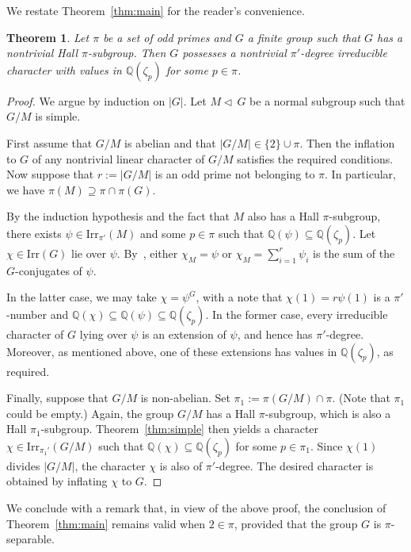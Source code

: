 \documentclass[12pt]{amsart}
\newtheorem{theorem}{Theorem}[section]
\theoremstyle{definition}
\numberwithin{equation}{section}
\newcommand{\Irr}{{\mathrm {Irr}}}
\newcommand{\QQ}{{\mathbb Q}}
\begin{document}
We restate Theorem~\ref{thm:main} for the reader's convenience.

\begin{theorem}
Let $\pi$ be a set of odd primes and $G$ a finite group such that
$G$ has a nontrivial Hall $\pi$-subgroup. Then $G$ possesses a
nontrivial $\pi'$-degree irreducible character with values in
$\QQ(\zeta_p)$ for some $p\in\pi$.
\end{theorem}

\begin{proof}
We argue by induction on $|G|$. Let $M \triangleleft\, G$ be a
normal subgroup such that $G/M$ is simple.

First assume that $G/M$ is abelian and that $|G/M| \in \{2\} \cup
\pi$. Then the inflation to $G$ of any nontrivial linear character
of $G/M$ satisfies the required conditions. Now suppose that $r :=
|G/M|$ is an odd prime not belonging to $\pi$. In particular, we
have $\pi(M) \supseteq \pi\cap\pi(G)$.

By the induction hypothesis and the fact that $M$ also has a Hall
$\pi$-subgroup, there exists $\psi \in \Irr_{\pi'}(M)$ and some $p
\in \pi$ such that $\QQ(\psi) \subseteq \QQ(\zeta_p)$. Let $\chi \in
\Irr(G)$ lie over $\psi$. By~\cite[Corollary~6.19]{Isaacs1}, either
$\chi_M = \psi$ or $\chi_M = \sum_{i=1}^r \psi_i$ is the sum of the
$G$-conjugates of $\psi$.

In the latter case, we may take $\chi = \psi^G$, with a note that
$\chi(1) = r \psi(1)$ is a $\pi'$-number and $\QQ(\chi) \subseteq
\QQ(\psi)\subseteq \QQ(\zeta_p)$. In the former case, every
irreducible character of $G$ lying over $\psi$ is an extension of
$\psi$, and hence has $\pi'$-degree. Moreover, as mentioned above,
one of these extensions has values in $\QQ(\zeta_p)$, as required.

Finally, suppose that $G/M$ is non-abelian. Set $\pi_1 := \pi(G/M)
\cap \pi$. (Note that $\pi_1$ could be empty.) Again, the group
$G/M$ has a Hall $\pi$-subgroup, which is also a Hall
$\pi_1$-subgroup. Theorem~\ref{thm:simple} then yields a character
$\chi \in \Irr_{\pi_1'}(G/M)$ such that $\QQ(\chi) \subseteq
\QQ(\zeta_p)$ for some $p \in \pi_1$. Since $\chi(1)$ divides
$|G/M|$, the character $\chi$ is also of $\pi'$-degree. The desired
character is obtained by inflating $\chi$ to $G$.
\end{proof}

We conclude with a remark that, in view of the above proof, the
conclusion of Theorem~\ref{thm:main} remains valid when $2 \in \pi$,
provided that the group $G$ is $\pi$-separable.
\end{document}
